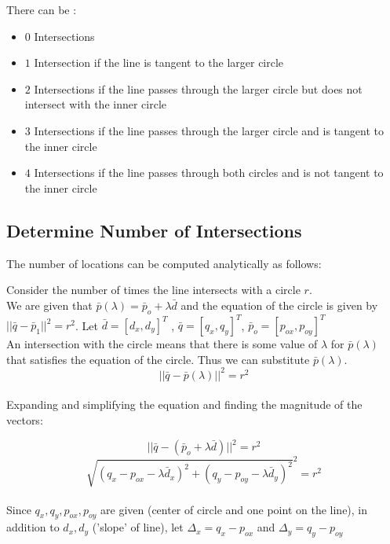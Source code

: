 \documentclass[a4paper,10pt]{scrartcl}
\begin{document}
There can be :

\begin{itemize}
 \item $0$ Intersections
 \item $1$ Intersection if the line is tangent to the larger circle
 \item $2$ Intersections if the line passes through the larger circle but does not intersect with the inner circle
 \item $3$ Intersections if the line passes through the larger circle and is tangent to the inner circle
 \item $4$ Intersections if the line passes through both circles and is not tangent to the inner circle
\end{itemize}

\subsection{Determine Number of Intersections}

The number of locations can be computed analytically as follows:

Consider the number of times the line intersects with a circle $r$.\\

We are given that $\bar p(\lambda) = \bar p_o + \lambda\bar d$ and the equation of the circle is given by \\$||\bar q - \bar p_1 ||^2 = r^2$. Let $\bar d = [d_x, d_y]^T$ ,
$\bar q = [q_x, q_y]^T$, $\bar p_o = [p_{ox}, p_{oy}]^T$ \\

An intersection with the circle means that there is some value of $\lambda$ for $\bar p(\lambda)$ that satisfies the equation of the circle. Thus we can substitute $\bar p(\lambda)$.\\

\[||\bar q - \bar p(\lambda)||^2 = r^2\]\\

Expanding and simplifying the equation and finding the magnitude of the vectors:

\[||\bar q - (\bar p_o + \lambda\bar d) || ^2 = r^2\]
\[\sqrt{ (q_x - p_{ox} - \lambda\bar d_x)^2 +  (q_y - p_{oy} - \lambda\bar d_y)^2}^2  = r^2\]\\

Since $q_x, q_y, p_{ox}, p_{oy}$ are given (center of circle and one point on the line), in addition to $d_x, d_y$ ('slope' of line), let $\Delta_x = q_x - p_{ox}$ and $\Delta_y = q_y - p_{oy}$
\end{document}
